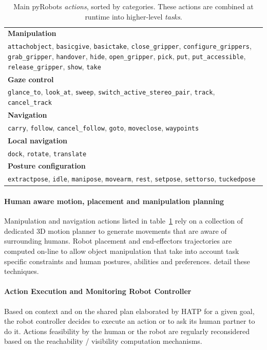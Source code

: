 \documentclass[preprint,3p,times]{elsarticle}
\begin{document}
\begin{table}
\begin{center}
\begin{tabular}{p{8cm}}
\hline
    {\bf Manipulation} \\
     {\tt attachobject}, {\tt basicgive}, {\tt basictake}, {\tt close\_gripper}, {\tt configure\_grippers}, {\tt grab\_gripper}, {\tt handover}, {\tt hide}, {\tt open\_gripper}, {\tt pick}, {\tt put}, {\tt put\_accessible}, {\tt release\_gripper}, {\tt show}, {\tt take} \\
\hline
    {\bf Gaze control} \\
     {\tt glance\_to}, {\tt look\_at}, {\tt sweep}, {\tt switch\_active\_stereo\_pair}, {\tt track}, {\tt cancel\_track} \\
\hline
    {\bf Navigation} \\
     {\tt carry}, {\tt follow}, {\tt cancel\_follow}, {\tt goto}, {\tt moveclose}, {\tt waypoints} \\
\hline
    {\bf Local navigation} \\
     {\tt dock}, {\tt rotate}, {\tt translate} \\
\hline
    {\bf Posture configuration} \\
     {\tt extractpose}, {\tt idle}, {\tt manipose}, {\tt movearm}, {\tt rest}, {\tt setpose}, {\tt settorso}, {\tt tuckedpose} \\
\hline
\end{tabular}
\end{center}
\caption{Main {\sc pyRobots} \emph{actions}, sorted by categories. These
actions are combined at runtime into higher-level \emph{tasks}.}

\label{table|pyrobots_actions}
\end{table}

\paragraph{Human aware motion, placement and manipulation planning}
Manipulation and navigation actions listed in
table~\ref{table|pyrobots_actions} rely on a collection of dedicated 3D motion
planner to generate movements that are aware of surrounding humans. Robot
placement and end-effectors trajectories are computed on-line to allow object
manipulation that take into account task specific constraints and human
postures, abilities and preferences. \cite{Sisbot2008, Mainprice2011,
Pandey2011} detail these techniques.


\paragraph{Action Execution and Monitoring Robot Controller}
Based on context and on the shared plan elaborated by HATP for a given goal,
the robot controller decides to execute an action or to ask its human
partner to do it.  Actions feasibility by the human or the robot are
regularly reconsidered based on the reachability / visibility
computation mechanisms.
\end{document}
